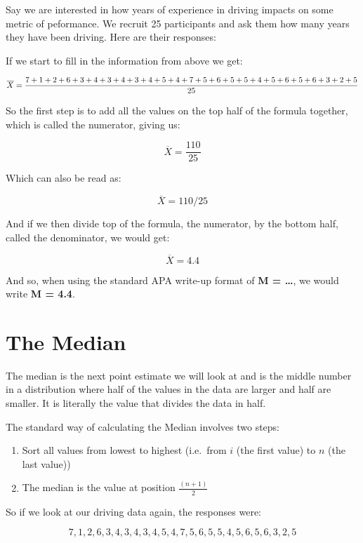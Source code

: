 \documentclass[
  oneside]{book}
\providecommand{\tightlist}{%
  \setlength{\itemsep}{0pt}\setlength{\parskip}{0pt}}
\begin{document}
Say we are interested in how years of experience in driving impacts on some metric of peformance. We recruit 25 participants and ask them how many years they have been driving. Here are their responses:

If we start to fill in the information from above we get:

\[\overline{X} = \frac{7 +
1 +
2+
6+
3+\\
4+
3+
4+
3+
4+\\
5+
4+
7+
5+
6+\\
5+
5+
4+
5+
6+\\
5+
6+
3+
2+
5}{25}\]

So the first step is to add all the values on the top half of the formula together, which is called the numerator, giving us:

\[\overline{X} =\frac{110}{25}\]

Which can also be read as:

\[\overline{X} = 110/25\]

And if we then divide top of the formula, the numerator, by the bottom half, called the denominator, we would get:

\[\overline{X} = 4.4\]

And so, when using the standard APA write-up format of \textbf{M = \ldots{}}, we would write \textbf{M = 4.4}.

\hypertarget{the-median}{%
\section{The Median}\label{the-median}}

The median is the next point estimate we will look at and is the middle number in a distribution where half of the values in the data are larger and half are smaller. It is literally the value that divides the data in half.

The standard way of calculating the Median involves two steps:

\begin{enumerate}
\def\labelenumi{\arabic{enumi}.}
\tightlist
\item
  Sort all values from lowest to highest (i.e.~from \(i\) (the first value) to \(n\) (the last value))
\item
  The median is the value at position \(\frac{(n + 1)}{2}\)
\end{enumerate}

So if we look at our driving data again, the responses were:

\[7, 1, 2, 6, 3, 4, 3, 4, 3, 4, 5, 4, 7, 5, 6, 5, 5, 4, 5, 6, 5, 6, 3, 2, 5\]
\end{document}
